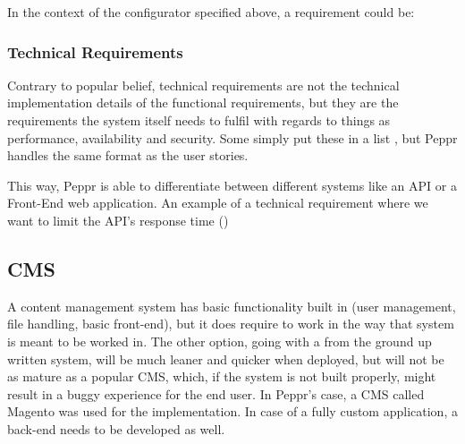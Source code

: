 \newline

In the context of the configurator specified above, a requirement could be: \newline

\newline

\subsubsection{Technical Requirements}
Contrary to popular belief, technical requirements are not the technical implementation details of the functional requirements, but they are the requirements the system itself needs to fulfil with regards to things as performance, availability and security. Some simply put these in a list \cite{Agile: Technical Requirements}, but Peppr handles the same format as the user stories.\newline

\newline

This way, Peppr is able to differentiate between different systems like an API or a Front-End web application. An example of a technical requirement where we want to limit the API's response time (\cite{Response Times})\newline

\newline

\subsection{CMS}
A content management system has basic functionality built in (user management, file handling, basic front-end), but it does require to work in the way that system is meant to be worked in. The other option, going with a from the ground up written system, will be much leaner and quicker when deployed, but will not be as mature as a popular CMS, which, if the system is not built properly, might result in a buggy experience for the end user. In Peppr's case, a CMS called Magento was used for the implementation. In case of a fully custom application, a back-end needs to be developed as well.

